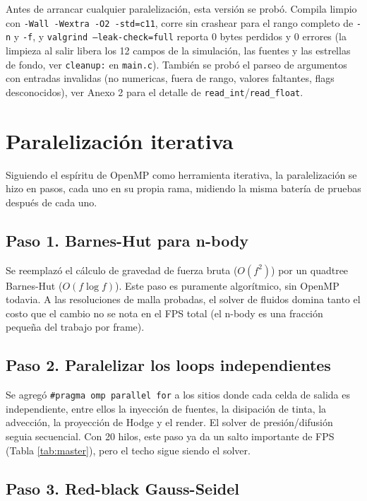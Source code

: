 \documentclass[11pt]{article}
\begin{document}
Antes de arrancar cualquier paralelización, esta versión se probó.
Compila limpio con \texttt{-Wall -Wextra -O2 -std=c11}, corre sin
crashear para el rango completo de \texttt{-n} y \texttt{-f}, y
\texttt{valgrind --leak-check=full} reporta 0 bytes perdidos y 0 errores
(la limpieza al salir libera los 12 campos de la simulación, las fuentes
y las estrellas de fondo, ver \texttt{cleanup:} en \texttt{main.c}).
También se probó el parseo de argumentos con entradas invalidas
(no numericas, fuera de rango, valores faltantes, flags desconocidos), 
ver Anexo 2 para el detalle de \texttt{read\_int}/\texttt{read\_float}.

\newpage

\section{Paralelización iterativa}\label{sec:paralelizacion}

Siguiendo el espíritu de OpenMP como herramienta iterativa, la
paralelización se hizo en pasos, cada uno en su propia rama, midiendo la
misma batería de pruebas después de cada uno.

\subsection{Paso 1. Barnes-Hut para n-body}

Se reemplazó el cálculo de gravedad de fuerza bruta ($O(f^2)$) por un
quadtree Barnes-Hut ($O(f \log f)$). Este paso es puramente algorítmico,
sin OpenMP todavia. A las resoluciones de malla probadas, el solver de
fluidos domina tanto el costo que el cambio no se nota en el FPS total
(el n-body es una fracción pequeña del trabajo por frame).

\subsection{Paso 2. Paralelizar los loops independientes}

Se agregó \texttt{\#pragma omp parallel for} a los sitios donde cada celda
de salida es independiente, entre ellos la inyección de fuentes, la
disipación de tinta, la advección, la proyección de Hodge y el render. El solver de presión/difusión
seguia secuencial. Con 20 hilos, este paso ya da un salto importante de
FPS (Tabla \ref{tab:master}), pero el techo sigue siendo el solver.

\subsection{Paso 3. Red-black Gauss-Seidel}
\label{sec:redblack}
\end{document}

